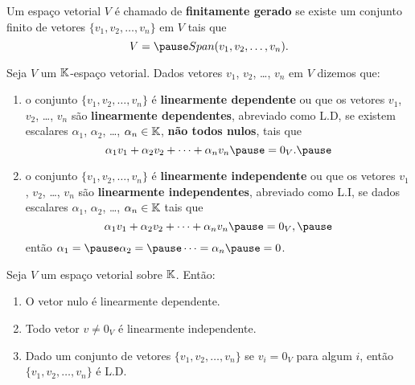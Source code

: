 \documentclass{beamer}
\begin{document}
\begin{frame}
  \begin{definicao}
    Um espaço vetorial $V$ é chamado de \textbf{finitamente gerado} \pause se existe um conjunto finito \pause de vetores $\{v_1, v_2, \dots, v_n\}$ em $V$ \pause tais que\pause
    \[
        V = \pause Span(v_1, v_2, \dots, v_n).
    \]
  \end{definicao}
\end{frame}

\begin{frame}
  \begin{definicao}
    Seja $V$ um $\mathbb{K}$-espaço vetorial. \pause Dados vetores $v_1$, $v_2$, \dots, $v_n$ \pause em $V$ dizemos que:\pause
    \begin{enumerate}[label={\roman*})]
      \item o conjunto $\{v_1, v_2, \dots, v_n\}$ \pause é \textbf{linearmente dependente} \pause ou que os vetores $v_1$, $v_2$, \dots, $v_n$ \pause são \textbf{linearmente dependentes}, \pause abreviado como L.D, \pause se existem escalares
        $\alpha_1$, $\alpha_2$, \dots, $\alpha_n \in \mathbb{K}$, \pause \textbf{não todos nulos}, \pause tais que\pause
        \[
            \alpha_1v_1 + \alpha_2v_2 + \cdots + \alpha_nv_n \pause = 0_V.\pause
        \]

      \item o conjunto $\{v_1, v_2, \dots, v_n\}$ \pause é \textbf{linearmente independente} \pause ou que os vetores $v_1$, $v_2$, \dots, $v_n$ \pause são \textbf{linearmente independentes}, \pause abreviado como L.I, \pause se dados escalares
        $\alpha_1$, $\alpha_2$, \dots, $\alpha_n \in \mathbb{K}$  tais que\pause
        \[
            \alpha_1v_1 + \alpha_2v_2 + \cdots + \alpha_nv_n \pause = 0_V,\pause
        \]
        então $\alpha_1 = \pause \alpha_2 = \pause \cdots = \alpha_n \pause = 0$.
    \end{enumerate}
  \end{definicao}
\end{frame}


\begin{frame}
  \begin{proposicao}
  Seja $V$ um espaço vetorial sobre $\mathbb{K}$. Então:\pause

  \begin{enumerate}[label={\roman*})]
    \item O vetor nulo é linearmente dependente.\pause

    \vspace{.3cm}

    \item Todo vetor $v \ne 0_V$ \pause é linearmente independente.\pause

    \vspace{.3cm}

    \item Dado um conjunto de vetores $\{v_1, v_2, \dots, v_n\}$ \pause se $v_i = 0_V$ para algum $i$, \pause então $\{v_1, v_2, \dots, v_n\}$ é L.D.

    \seti
  \end{enumerate}
  \end{proposicao}
\end{frame}
\end{document}
